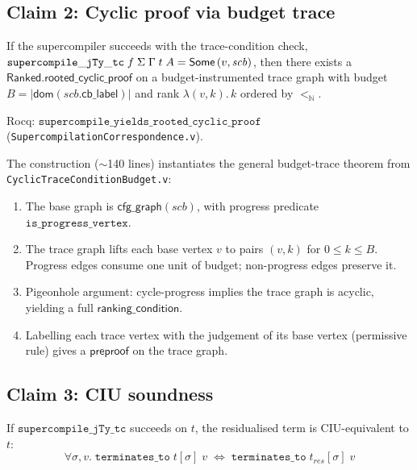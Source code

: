 \subsection{Claim 2: Cyclic proof via budget trace}

\begin{theorem}
\label{thm:mech-cyclic}
If the supercompiler succeeds with the trace-condition check,
$\mathtt{supercompile\_jTy\_tc}\;f\;\Sigma\;\Gamma\;t\;A = \mathsf{Some}\,(v,\mathit{scb})$,
then there exists a $\mathsf{Ranked.rooted\_cyclic\_proof}$ on a budget-instrumented trace graph with budget $B = |\mathsf{dom}(\mathit{scb}.\mathsf{cb\_label})|$ and rank $\lambda(v,k).\,k$ ordered by $<_\mathbb{N}$.
\end{theorem}

\noindent Rocq: $\texttt{supercompile\_yields\_rooted\_cyclic\_proof}$ (\texttt{SupercompilationCorrespondence.v}).

The construction ($\sim$140 lines) instantiates the general budget-trace theorem from \texttt{CyclicTraceConditionBudget.v}:
\begin{enumerate}[leftmargin=*,nosep]
\item The base graph is $\mathsf{cfg\_graph}(\mathit{scb})$, with progress predicate $\texttt{is\_progress\_vertex}$.
\item The trace graph lifts each base vertex $v$ to pairs $(v,k)$ for $0 \le k \le B$.
Progress edges consume one unit of budget; non-progress edges preserve it.
\item Pigeonhole argument: cycle-progress implies the trace graph is acyclic, yielding a full $\mathsf{ranking\_condition}$.
\item Labelling each trace vertex with the judgement of its base vertex (permissive rule) gives a $\mathsf{preproof}$ on the trace graph.
\end{enumerate}

\subsection{Claim 3: CIU soundness}

\begin{theorem}
\label{thm:mech-ciu}
If $\mathtt{supercompile\_jTy\_tc}$ succeeds on $t$, the residualised term is CIU-equivalent to $t$:
\[
\forall \sigma, v.\; \mathtt{terminates\_to}\;t[\sigma]\;v \;\iff\; \mathtt{terminates\_to}\;t_{\mathit{res}}[\sigma]\;v
\]
\end{theorem}

